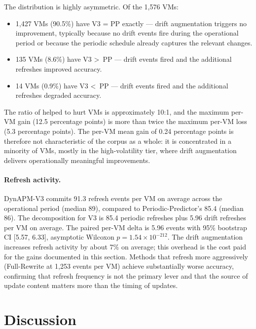 \documentclass[manuscript,screen,review,anonymous]{acmart}
\begin{document}
The distribution is highly asymmetric. Of the 1{,}576 VMs:
\begin{itemize}
\item 1{,}427 VMs (90.5\%) have V3 = PP exactly --- drift
augmentation triggers no improvement, typically because no drift
events fire during the operational period or because the periodic
schedule already captures the relevant changes.
\item 135 VMs (8.6\%) have V3 \textgreater\ PP --- drift events fired
and the additional refreshes improved accuracy.
\item 14 VMs (0.9\%) have V3 \textless\ PP --- drift events fired
and the additional refreshes degraded accuracy.
\end{itemize}

The ratio of helped to hurt VMs is approximately 10:1, and the
maximum per-VM gain (12.5 percentage points) is more than twice
the maximum per-VM loss (5.3 percentage points). The per-VM mean
gain of 0.24 percentage points is therefore not characteristic of
the corpus as a whole: it is concentrated in a minority of VMs,
mostly in the high-volatility tier, where drift augmentation
delivers operationally meaningful improvements.

\paragraph{Refresh activity.} DynAPM-V3 commits 91.3 refresh events
per VM on average across the operational period (median 89),
compared to Periodic-Predictor's 85.4 (median 86). The
decomposition for V3 is 85.4 periodic refreshes plus 5.96 drift
refreshes per VM on average. The paired per-VM delta is 5.96
events with 95\% bootstrap CI [5.57, 6.33], asymptotic Wilcoxon
$p = 1.54 \times 10^{-212}$. The drift augmentation increases refresh activity by
about 7\% on average; this overhead is the cost paid for the
gains documented in this section. Methods that refresh more
aggressively (Full-Rewrite at 1{,}253 events per VM) achieve
substantially worse accuracy, confirming that refresh frequency
is not the primary lever and that the source of update content
matters more than the timing of updates.

\section{Discussion}\label{sec:discussion}
\end{document}
